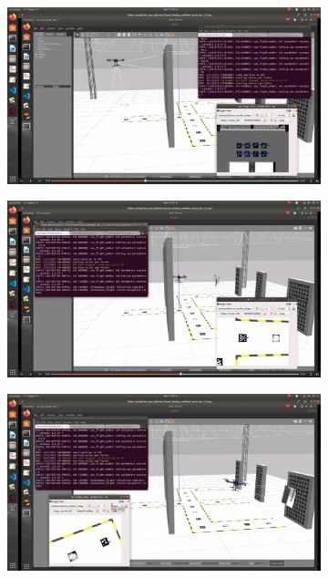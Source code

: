 \documentclass[../Head/report.tex]{subfiles}
\begin{document}
\begin{figure}[H]
    \centering
    \begin{subfigure}[t]{.30\textwidth}
        \centering
        \includegraphics[width=\textwidth]{../Figures/vision_navigation/gps2vision.png}
        \caption{}
        \label{fig:vision_navigation_gps2vision}
    \end{subfigure}
     \hspace{0.2em}
    \begin{subfigure}[t]{.30\textwidth}
        \centering
        \includegraphics[width=\textwidth]{../Figures/vision_navigation/vision_navigation_one.png}
        \caption{}
        \label{fig:vision_navigation_vision_navigation_one}
    \end{subfigure}
     \hspace{0.2em}
    \begin{subfigure}[t]{.30\textwidth}
        \centering
        \includegraphics[width=\textwidth]{../Figures/vision_navigation/vision_navigation_two.png}

\end{subfigure}
\end{figure}
\end{document}

